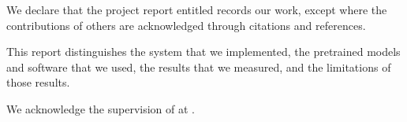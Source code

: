 \noindent We declare that the project report entitled
\textbf{\ProjectFullTitle} records our work, except where the contributions
of others are acknowledged through citations and references.

\noindent This report distinguishes the system that we implemented,
the pretrained models and software that we used, the results that we measured,
and the limitations of those results.

\noindent We acknowledge the supervision of \SupervisorName{} at
\UniversityName.

\vspace{1em}
\StudentSignature{\TeamMemberOne}
\StudentSignature{\TeamMemberTwo}
\StudentSignature{\TeamMemberThree}
\clearpage

